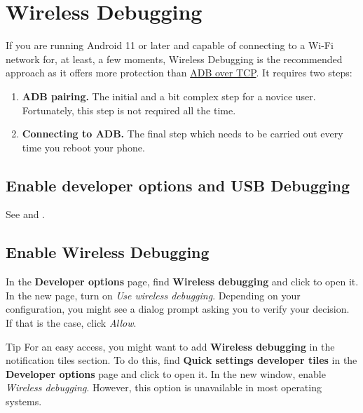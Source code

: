 \section{Wireless Debugging}\label{sec:wireless-debugging} %
If you are running Android 11 or later and capable of connecting to a Wi-Fi network for, at least, a few moments,
Wireless Debugging is the recommended approach as it offers more protection than \hyperref[sec:adb-over-tcp]{ADB over TCP}.
It requires two steps:
\begin{enumerate}
    \item \textbf{ADB pairing.} The initial and a bit complex step for a novice user. Fortunately, this step is not required all the time.
    \item \textbf{Connecting to ADB.} The final step which needs to be carried out every time you reboot your phone.
\end{enumerate}

\subsection{Enable developer options and USB Debugging}\label{subsec:enable-developer-options-and-usb-debugging} %
See  and .

\subsection{Enable Wireless Debugging}\label{subsec:enable-wireless-debugging} %
In the \textbf{Developer options} page, find \textbf{Wireless debugging} and click to open it. In the new page,
turn on \textit{Use wireless debugging}. Depending on your configuration, you might see a dialog prompt asking you to verify your decision.
If that is the case, click \textit{Allow}.

\begin{tip}{Tip}
    For an easy access, you might want to add \textbf{Wireless debugging} in the notification tiles section. To do this,
    find \textbf{Quick settings developer tiles} in the \textbf{Developer options} page and click to open it.
    In the new window, enable \textit{Wireless debugging}. However, this option is unavailable in most operating systems.
\end{tip}

